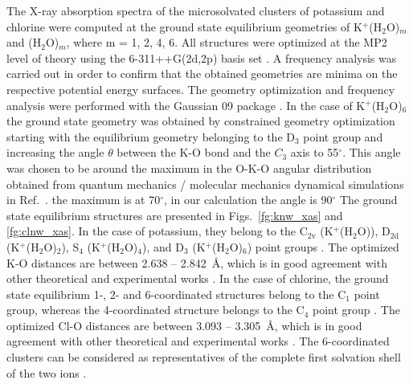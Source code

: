 The X-ray absorption spectra of the microsolvated clusters of potassium and chlorine were computed at the ground state equilibrium geometries of K$^+$(H$_2$O)$_m$ and \cli(H$_2$O)$_m$, where m = 1, 2, 4, 6. All structures were optimized at the MP2 level of theory using the 6-311++G(2d,2p) basis set \citep{Krishnan80:650,Blaudeau97:5016}. A frequency analysis was carried out in order to confirm that the obtained geometries are minima on the respective potential energy surfaces. The geometry optimization and frequency analysis were performed with the Gaussian 09 package \citep{g09}. In the case of K$^{+}$(H$_2$O)$_6$ the ground state geometry was obtained by constrained geometry optimization starting with the equilibrium geometry \citep{lee99:3995} belonging to the D$_3$ point group and increasing the angle $\theta$ between the K-O bond and the $C_3$ axis to 55$^{\circ}$. This angle was chosen to be around the maximum in the O-K-O angular distribution obtained from quantum mechanics / molecular mechanics dynamical simulations in Ref.\ \citep{ma14:1006}. {\color{red} the maximum is at 70$^{\circ}$, in our calculation the angle is 90$^{\circ}$} The ground state equilibrium structures are presented in Figs.\ \ref{fg:knw_xas} and \ref{fg:clnw_xas}. In the case of potassium, they belong to the C$_{2\text{v}}$ (K$^{+}$(H$_2$O)), D$_{2\text{d}}$ (K$^{+}$(H$_2$O)$_2$), S$_4$ (K$^{+}$(H$_2$O)$_4$), and D$_3$ (K$^{+}$(H$_2$O)$_6$) point groups \citep{rao08:12944}. The optimized K-O distances are between 2.638 -- 2.842~\AA, which is in good agreement with other theoretical and experimental works \citep{Ohtaki93:1157,soper06:180,ma14:1006}. In the case of chlorine, the ground state equilibrium 1-, 2- and 6-coordinated structures belong to the C$_{1}$ point group, whereas the 4-coordinated structure belongs to the C$_4$ point group \citep{gora00:7}. The optimized Cl-O distances are between 3.093 -- {\color{red}3.305}~\AA, which is in good agreement with other theoretical and experimental works \citep{ge13:13169,gora00:7,Ohtaki93:1157,soper06:180,ma14:1006}. The 6-coordinated clusters can be considered as representatives of the complete first solvation shell of the two ions \citep{Ohtaki93:1157,soper06:180,ma14:1006}.


